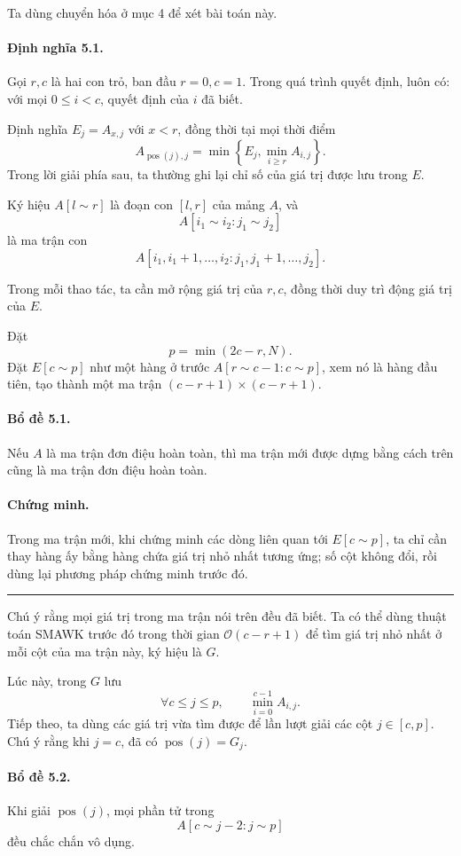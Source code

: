 \documentclass[11pt]{article}
\newcommand{\Oh}{\mathcal{O}}
\newcommand{\qedmark}{\hfill\rule{0.7ex}{0.7ex}}
\begin{document}
Ta dùng chuyển hóa ở mục 4 để xét bài toán này.

\paragraph{Định nghĩa 5.1.}
Gọi \(r,c\) là hai con trỏ, ban đầu \(r=0,c=1\). Trong quá trình quyết định,
luôn có: với mọi \(0\le i<c\), quyết định của \(i\) đã biết.

Định nghĩa \(E_j=A_{x,j}\) với \(x<r\), đồng thời tại mọi thời điểm
\[
  A_{\operatorname{pos}(j),j}
  =\min\left\{E_j,\min_{i\ge r}A_{i,j}\right\}.
\]
Trong lời giải phía sau, ta thường ghi lại chỉ số của giá trị được lưu trong
\(E\).

Ký hiệu \(A[l\sim r]\) là đoạn con \([l,r]\) của mảng \(A\), và
\[
  A[i_1\sim i_2:j_1\sim j_2]
\]
là ma trận con
\[
  A[i_1,i_1+1,\ldots,i_2:j_1,j_1+1,\ldots,j_2].
\]

Trong mỗi thao tác, ta cần mở rộng giá trị của \(r,c\), đồng thời duy trì động
giá trị của \(E\).

Đặt
\[
  p=\min(2c-r,N).
\]
Đặt \(E[c\sim p]\) như một hàng ở trước \(A[r\sim c-1:c\sim p]\), xem nó là
hàng đầu tiên, tạo thành một ma trận \((c-r+1)\times(c-r+1)\).

\paragraph{Bổ đề 5.1.}
Nếu \(A\) là ma trận đơn điệu hoàn toàn, thì ma trận mới được dựng bằng cách
trên cũng là ma trận đơn điệu hoàn toàn.

\paragraph{Chứng minh.}
Trong ma trận mới, khi chứng minh các dòng liên quan tới \(E[c\sim p]\), ta
chỉ cần thay hàng ấy bằng hàng chứa giá trị nhỏ nhất tương ứng; số cột không
đổi, rồi dùng lại phương pháp chứng minh trước đó. \qedmark

Chú ý rằng mọi giá trị trong ma trận nói trên đều đã biết. Ta có thể dùng
thuật toán SMAWK trước đó trong thời gian \(\Oh(c-r+1)\) để tìm giá trị nhỏ
nhất ở mỗi cột của ma trận này, ký hiệu là \(G\).

Lúc này, trong \(G\) lưu
\[
  \forall c\le j\le p,\qquad
  \min_{i=0}^{c-1} A_{i,j}.
\]
Tiếp theo, ta dùng các giá trị vừa tìm được để lần lượt giải các cột
\(j\in[c,p]\). Chú ý rằng khi \(j=c\), đã có \(\operatorname{pos}(j)=G_j\).

\paragraph{Bổ đề 5.2.}
Khi giải \(\operatorname{pos}(j)\), mọi phần tử trong
\[
  A[c\sim j-2:j\sim p]
\]
đều chắc chắn vô dụng.
\end{document}
